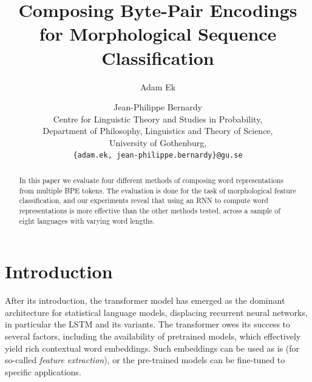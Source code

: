 \documentclass[11pt]{article}
\title{Composing Byte-Pair Encodings for Morphological Sequence Classification}
\author{Adam Ek \and Jean-Philippe Bernardy\\
	Centre for Linguistic Theory and Studies in Probability,\\
	Department of Philosophy, Linguistics and Theory of Science,\\
	University of Gothenburg,\\
	\texttt{\{adam.ek, jean-philippe.bernardy\}@gu.se}}
\date{}
\newcommand\citep{\cite}
\begin{document}
	\maketitle
	
	\begin{abstract}
        		In this paper we evaluate four different methods of
     composing word representations from multiple BPE tokens. The
     evaluation is done for the task of morphological feature
     classification, and our experiments reveal that using an RNN to
     compute word representations is more effective than the other
     methods tested, across a sample of eight languages with varying
     word lengths.
	\end{abstract}
	
	\section{Introduction}
	\label{intro}

            After its introduction, the transformer model
     \citep{vaswani2017attention} has emerged as the dominant
     architecture for statistical language models, displacing
     recurrent neural networks, in particular the LSTM and its
     variants. The transformer owes its success to several factors,
     including the availability of pretrained models, which
     effectively yield rich contextual word embeddings. Such
     embeddings can be used as is (for so-called \emph{feature extraction}),
     or the pre-trained models can be fine-tuned to specific
     applications.
\end{document}
